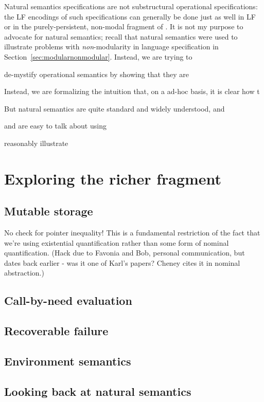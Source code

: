 Natural semantics specifications are not substructural operational
specifications: the LF encodings of such specifications can generally
be done just as well in LF or in the purely-persistent, non-modal
fragment of \sls. It is not my purpose to advocate for natural
semantics; recall that natural semantics were used to illustrate
problems with {\it non}-modularity in language specification in
Section~\ref{sec:modularnonmodular}. Instead, we are trying to


de-mystify operational semantics by showing that they are 

Instead, we are formalizing the
intuition that, on a ad-hoc basis, it is clear how t 

But natural semantics are
quite standard and widely understood, and 


 and are easy to talk about
using 

reasonably illustrate


\section{Exploring the richer fragment}
\label{sec:richer-ordered-abstract}

\subsection{Mutable storage}
\label{sec:mutable-storage}

No check for pointer inequality! This is a fundamental restriction of
the fact that we're using existential quantification rather than some
form of nominal quantification. (Hack due to Favonia and Bob, personal
communication, but dates back earlier - was it one of Karl's papers?
Cheney cites it in nominal abstraction.)

\subsection{Call-by-need evaluation}

\subsection{Recoverable failure}

\subsection{Environment semantics}

\subsection{Looking back at natural semantics}
\label{sec:enriching-natsem}

